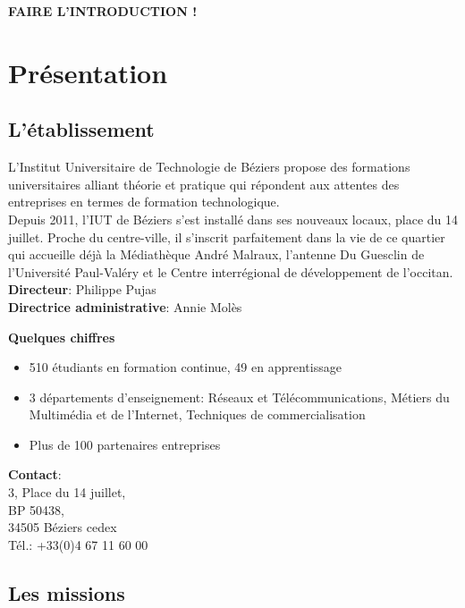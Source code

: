 \documentclass[12pt, french]{report}
\begin{document}
       \textbf{FAIRE L'INTRODUCTION !}

\newpage
\section*{Présentation}
\subsection*{L'établissement}

L'Institut Universitaire de Technologie de Béziers propose des formations universitaires alliant théorie et pratique qui répondent aux attentes des entreprises en termes de formation technologique. \\

Depuis 2011, l’IUT de Béziers s’est installé dans ses nouveaux locaux, place du 14 juillet. Proche du centre-ville, il s’inscrit parfaitement dans la vie de ce quartier qui accueille déjà la Médiathèque André Malraux, l’antenne Du Guesclin de l’Université Paul-Valéry et le Centre interrégional de développement de l’occitan.\\

\textbf{Directeur}: Philippe Pujas\\

\textbf{Directrice administrative}: Annie Molès\\
\bigskip

\textbf{Quelques chiffres}\\
\begin{itemize}
        \item 510 étudiants en formation continue, 49 en apprentissage
        \item 3 départements d'enseignement: Réseaux et Télécommunications, Métiers du Multimédia et de l'Internet, Techniques de commercialisation
        \item Plus de 100 partenaires entreprises\\
\end{itemize} 


\textbf{Contact}:\\ 3, Place du 14 juillet,\\ BP 50438,\\ 34505 Béziers cedex\\ Tél.: +33(0)4 67 11 60 00


\subsection*{Les missions}
\end{document}
